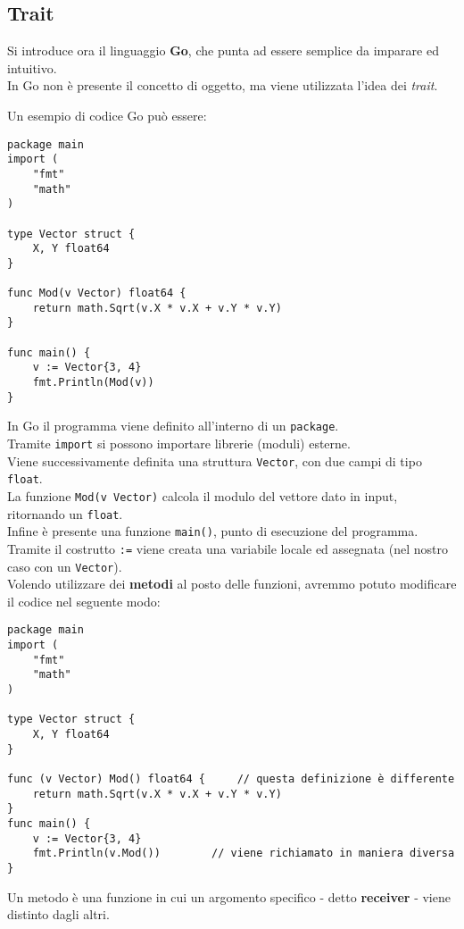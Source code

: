 \documentclass{article}
\begin{document}
\subsection*{Trait}
Si introduce ora il linguaggio \textbf{Go}, che punta ad essere semplice da imparare ed intuitivo.\\
In Go non è presente il concetto di oggetto, ma viene utilizzata l'idea dei \textit{trait}.

Un esempio di codice Go può essere:
\begin{tcolorbox}
\begin{verbatim}
package main
import (
    "fmt"
    "math"
)

type Vector struct {
    X, Y float64
}

func Mod(v Vector) float64 {
    return math.Sqrt(v.X * v.X + v.Y * v.Y)
}

func main() {
    v := Vector{3, 4}
    fmt.Println(Mod(v))
}
\end{verbatim}
\end{tcolorbox}
In Go il programma viene definito all'interno di un \texttt{package}.\\
Tramite \texttt{import} si possono importare librerie (moduli) esterne.\\
Viene successivamente definita una struttura \texttt{Vector}, con due campi di tipo \texttt{float}.\\
La funzione \texttt{Mod(v Vector)} calcola il modulo del vettore dato in input, ritornando un \texttt{float}.\\
Infine è presente una funzione \texttt{main()}, punto di esecuzione del programma.\\
Tramite il costrutto \texttt{:=} viene creata una variabile locale ed assegnata (nel nostro caso con un \texttt{Vector}).\vspace{14pt}\\
Volendo utilizzare dei \textbf{metodi} al posto delle funzioni, avremmo potuto modificare il codice nel seguente modo:
\begin{tcolorbox}
\begin{verbatim}
package main
import (
    "fmt"
    "math"
)

type Vector struct {
    X, Y float64
}

func (v Vector) Mod() float64 {     // questa definizione è differente
    return math.Sqrt(v.X * v.X + v.Y * v.Y)
}
func main() {
    v := Vector{3, 4}
    fmt.Println(v.Mod())        // viene richiamato in maniera diversa  
}
\end{verbatim}
\end{tcolorbox}
Un metodo è una funzione in cui un argomento specifico - detto \textbf{receiver} - viene distinto dagli altri.
\end{document}
